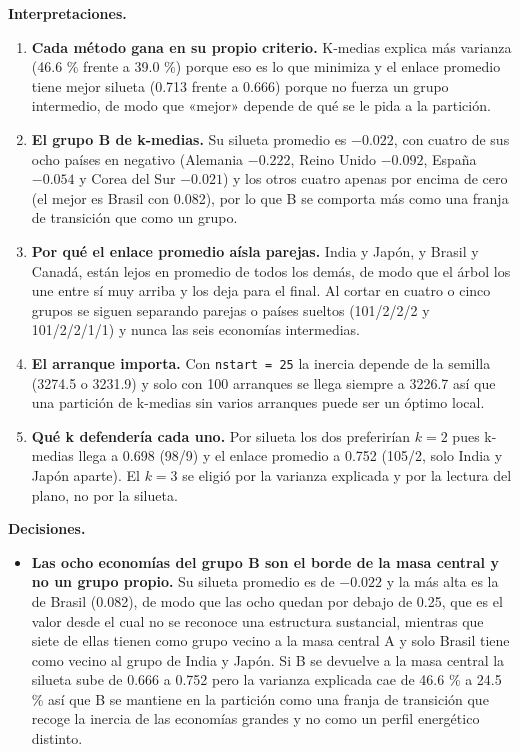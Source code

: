 \documentclass[oneside, openany, fontset=libertinus]{mitthesis}
\providecommand{\tightlist}{\setlength{\itemsep}{0pt}\setlength{\parskip}{0pt}}
\begin{document}
\begin{notas}

\textbf{Interpretaciones.}

\begin{enumerate}
\def\labelenumi{\alph{enumi}.}
\tightlist
\item
  \textbf{Cada método gana en su propio criterio.} K-medias explica más
  varianza (46.6 \% frente a 39.0 \%) porque eso es lo que minimiza y el
  enlace promedio tiene mejor silueta (0.713 frente a 0.666) porque no
  fuerza un grupo intermedio, de modo que «mejor» depende de qué se le
  pida a la partición.
\item
  \textbf{El grupo B de k-medias.} Su silueta promedio es \(-0.022\),
  con cuatro de sus ocho países en negativo (Alemania \(-0.222\), Reino
  Unido \(-0.092\), España \(-0.054\) y Corea del Sur \(-0.021\)) y los
  otros cuatro apenas por encima de cero (el mejor es Brasil con 0.082),
  por lo que B se comporta más como una franja de transición que como un
  grupo.
\item
  \textbf{Por qué el enlace promedio aísla parejas.} India y Japón, y
  Brasil y Canadá, están lejos en promedio de todos los demás, de modo
  que el árbol los une entre sí muy arriba y los deja para el final. Al
  cortar en cuatro o cinco grupos se siguen separando parejas o países
  sueltos (101/2/2/2 y 101/2/2/1/1) y nunca las seis economías
  intermedias.
\item
  \textbf{El arranque importa.} Con \texttt{nstart\ =\ 25} la inercia
  depende de la semilla (3274.5 o 3231.9) y solo con 100 arranques se
  llega siempre a 3226.7 así que una partición de k-medias sin varios
  arranques puede ser un óptimo local.
\item
  \textbf{Qué k defendería cada uno.} Por silueta los dos preferirían
  \(k = 2\) pues k-medias llega a 0.698 (98/9) y el enlace promedio a
  0.752 (105/2, solo India y Japón aparte). El \(k = 3\) se eligió por
  la varianza explicada y por la lectura del plano, no por la silueta.
\end{enumerate}

\textbf{Decisiones.}

\begin{itemize}
\item
  \textbf{Las ocho economías del grupo B son el borde de la masa central
  y no un grupo propio.} Su silueta promedio es de \(-0.022\) y la más
  alta es la de Brasil (0.082), de modo que las ocho quedan por debajo
  de 0.25, que es el valor desde el cual no se reconoce una estructura
  sustancial, mientras que siete de ellas tienen como grupo vecino a la
  masa central A y solo Brasil tiene como vecino al grupo de India y
  Japón. Si B se devuelve a la masa central la silueta sube de 0.666 a
  0.752 pero la varianza explicada cae de 46.6 \% a 24.5 \% así que B
  se mantiene en la partición como una franja de transición que recoge
  la inercia de las economías grandes y no como un perfil energético
  distinto.


\end{itemize}
\end{notas}
\end{document}
